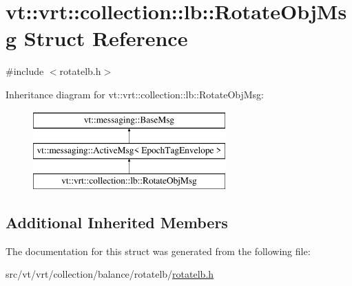 \hypertarget{structvt_1_1vrt_1_1collection_1_1lb_1_1_rotate_obj_msg}{}\section{vt\+:\+:vrt\+:\+:collection\+:\+:lb\+:\+:Rotate\+Obj\+Msg Struct Reference}
\label{structvt_1_1vrt_1_1collection_1_1lb_1_1_rotate_obj_msg}


{\ttfamily \#include $<$rotatelb.\+h$>$}

Inheritance diagram for vt\+:\+:vrt\+:\+:collection\+:\+:lb\+:\+:Rotate\+Obj\+Msg\+:\begin{figure}[H]
\begin{center}
\leavevmode
\includegraphics[height=3.000000cm]{structvt_1_1vrt_1_1collection_1_1lb_1_1_rotate_obj_msg}
\end{center}
\end{figure}
\subsection*{Additional Inherited Members}


The documentation for this struct was generated from the following file\+:\begin{DoxyCompactItemize}
\item 
src/vt/vrt/collection/balance/rotatelb/\hyperlink{rotatelb_8h}{rotatelb.\+h}\end{DoxyCompactItemize}
